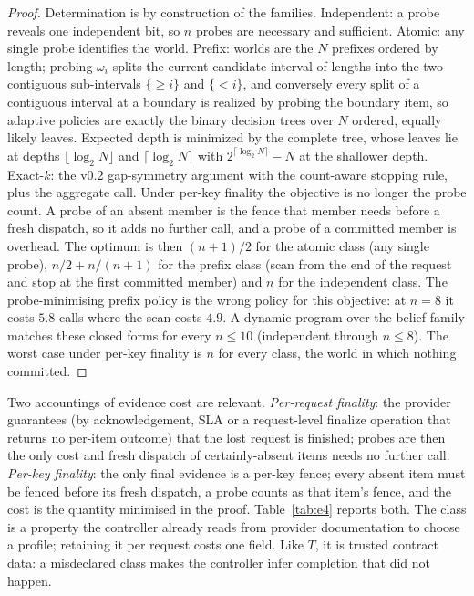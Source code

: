 \documentclass[conference,10pt]{IEEEtran}
\begin{document}
\begin{proof}
Determination is by construction of the families. Independent: a probe reveals one independent bit, so $n$ probes are necessary and sufficient. Atomic: any single probe identifies the world. Prefix: worlds are the $N$ prefixes ordered by length; probing $\omega_i$ splits the current candidate interval of lengths into the two contiguous sub-intervals $\{\ge i\}$ and $\{<i\}$, and conversely every split of a contiguous interval at a boundary is realized by probing the boundary item, so adaptive policies are exactly the binary decision trees over $N$ ordered, equally likely leaves. Expected depth is minimized by the complete tree, whose leaves lie at depths $\lfloor\log_2 N\rfloor$ and $\lceil\log_2 N\rceil$ with $2^{\lceil\log_2 N\rceil}-N$ at the shallower depth. Exact-$k$: the v0.2 gap-symmetry argument with the count-aware stopping rule, plus the aggregate call. Under per-key finality the objective is no longer the probe count. A probe of an absent member is the fence that member needs before a fresh dispatch, so it adds no further call, and a probe of a committed member is overhead. The optimum is then $(n+1)/2$ for the atomic class (any single probe), $n/2+n/(n+1)$ for the prefix class (scan from the end of the request and stop at the first committed member) and $n$ for the independent class. The probe-minimising prefix policy is the wrong policy for this objective: at $n=8$ it costs $5.8$ calls where the scan costs $4.9$. A dynamic program over the belief family matches these closed forms for every $n\le 10$ (independent through $n\le 8$). The worst case under per-key finality is $n$ for every class, the world in which nothing committed.
\end{proof}
Two accountings of evidence cost are relevant. \emph{Per-request finality}: the provider guarantees (by acknowledgement, SLA or a request-level finalize operation that returns no per-item outcome) that the lost request is finished; probes are then the only cost and fresh dispatch of certainly-absent items needs no further call. \emph{Per-key finality}: the only final evidence is a per-key fence; every absent item must be fenced before its fresh dispatch, a probe counts as that item's fence, and the cost is the quantity minimised in the proof. Table~\ref{tab:e4} reports both. The class is a property the controller already reads from provider documentation to choose a profile; retaining it per request costs one field. Like $T$, it is trusted contract data: a misdeclared class makes the controller infer completion that did not happen.
\end{document}
